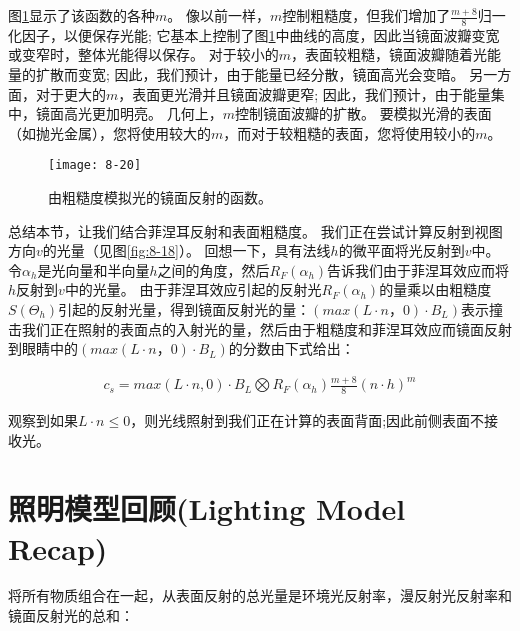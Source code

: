 \begin{flushleft}
图\ref{fig:8-20}显示了该函数的各种$m$。 像以前一样，$m$控制粗糙度，但我们增加了$\frac{m+8}{8}$归一化因子，以便保存光能; 它基本上控制了图\ref{fig:8-20}中曲线的高度，因此当镜面波瓣变宽或变窄时，整体光能得以保存。 对于较小的$m$，表面较粗糙，镜面波瓣随着光能量的扩散而变宽; 因此，我们预计，由于能量已经分散，镜面高光会变暗。 另一方面，对于更大的$m$，表面更光滑并且镜面波瓣更窄; 因此，我们预计，由于能量集中，镜面高光更加明亮。 几何上，$m$控制镜面波瓣的扩散。 要模拟光滑的表面（如抛光金属），您将使用较大的$m$，而对于较粗糙的表面，您将使用较小的$m$。
\end{flushleft}

\begin{figure}[h]
    \label{fig:8-20}
    \texttt{[image: 8-20]}
    \centering
    \caption{由粗糙度模拟光的镜面反射的函数。}
\end{figure}

\begin{flushleft}
总结本节，让我们结合菲涅耳反射和表面粗糙度。 我们正在尝试计算反射到视图方向$v$的光量（见图\ref{fig:8-18}）。 回想一下，具有法线$h$的微平面将光反射到$v$中。令$\alpha_{h}$是光向量和半向量$h$之间的角度，然后$R_{F}(\alpha_{h})$告诉我们由于菲涅耳效应而将$h$反射到$v$中的光量。 由于菲涅耳效应引起的反射光$R_{F}(\alpha_{h})$的量乘以由粗糙度$S(\Theta_{h})$引起的反射光量，得到镜面反射光的量：$(max(L\cdot n，0)\cdot B_{L})$表示撞击我们正在照射的表面点的入射光的量，然后由于粗糙度和菲涅耳效应而镜面反射到眼睛中的$(max(L\cdot n，0)\cdot B_{L})$的分数由下式给出：\\
\end{flushleft}

\begin{align*}\tag{eq.8.3}\label{eq.8.3}
c_{s}=max(L\cdot n, 0)\cdot B_{L}\bigotimes R_{F}(\alpha_{h})\frac{m+8}{8}(n\cdot h)^{m}
\end{align*}

\begin{flushleft}
观察到如果$L\cdot n\leq 0$，则光线照射到我们正在计算的表面背面;因此前侧表面不接收光。
\end{flushleft}

\section{照明模型回顾(Lighting Model Recap)}
\begin{flushleft}
将所有物质组合在一起，从表面反射的总光量是环境光反射率，漫反射光反射率和镜面反射光的总和：\\
\end{flushleft}

